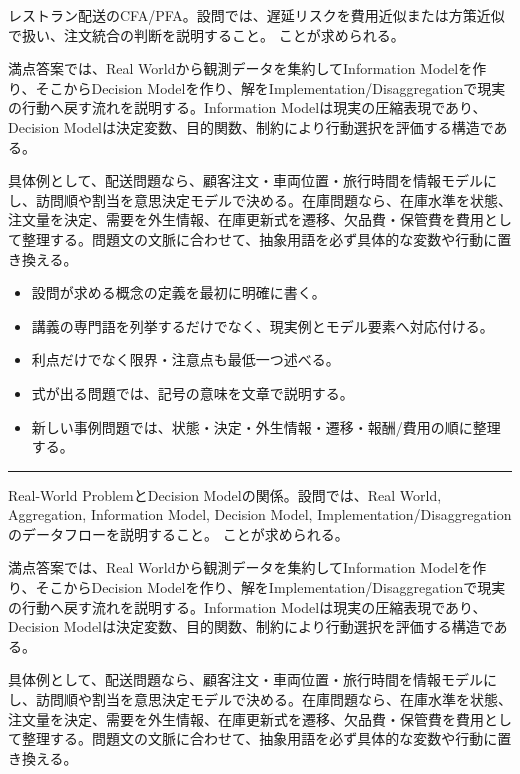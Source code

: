 \clearpage{}
レストラン配送のCFA/PFA。設問では、遅延リスクを費用近似または方策近似で扱い、注文統合の判断を説明すること。 ことが求められる。\par
{}
満点答案では、Real Worldから観測データを集約してInformation Modelを作り、そこからDecision Modelを作り、解をImplementation/Disaggregationで現実の行動へ戻す流れを説明する。Information Modelは現実の圧縮表現であり、Decision Modelは決定変数、目的関数、制約により行動選択を評価する構造である。\par
{}
具体例として、配送問題なら、顧客注文・車両位置・旅行時間を情報モデルにし、訪問順や割当を意思決定モデルで決める。在庫問題なら、在庫水準を状態、注文量を決定、需要を外生情報、在庫更新式を遷移、欠品費・保管費を費用として整理する。問題文の文脈に合わせて、抽象用語を必ず具体的な変数や行動に置き換える。\par
{}
\begin{itemize}
\item 設問が求める概念の定義を最初に明確に書く。
\item 講義の専門語を列挙するだけでなく、現実例とモデル要素へ対応付ける。
\item 利点だけでなく限界・注意点も最低一つ述べる。
\item 式が出る問題では、記号の意味を文章で説明する。
\item 新しい事例問題では、状態・決定・外生情報・遷移・報酬/費用の順に整理する。
\end{itemize}
\vspace{2mm}\hrule\vspace{2mm}
Real-World ProblemとDecision Modelの関係。設問では、Real World, Aggregation, Information Model, Decision Model, Implementation/Disaggregationのデータフローを説明すること。 ことが求められる。\par
{}
満点答案では、Real Worldから観測データを集約してInformation Modelを作り、そこからDecision Modelを作り、解をImplementation/Disaggregationで現実の行動へ戻す流れを説明する。Information Modelは現実の圧縮表現であり、Decision Modelは決定変数、目的関数、制約により行動選択を評価する構造である。\par
{}
具体例として、配送問題なら、顧客注文・車両位置・旅行時間を情報モデルにし、訪問順や割当を意思決定モデルで決める。在庫問題なら、在庫水準を状態、注文量を決定、需要を外生情報、在庫更新式を遷移、欠品費・保管費を費用として整理する。問題文の文脈に合わせて、抽象用語を必ず具体的な変数や行動に置き換える。\par
